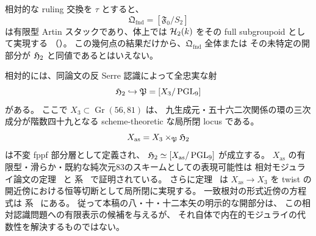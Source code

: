 相対的な ruling 交換を \(\tau\) とすると、
\[
 \mathfrak Q_{\mathrm{fnd}}=[\mathfrak F_0/S_2]
\]
は有限型 Artin スタックであり、体上では
\(\mathcal H_2(k)\) をその full subgroupoid として実現する
（\cite[\texttt{cor:h2-point-groupoid-foundation}]{QuadricModuli2026}）。
この幾何点の結果だけから、\(\mathfrak Q_{\mathrm{fnd}}\) 全体または
その未特定の開部分が \(\mathfrak H_2\) と同値であるとはいえない。

相対的には、同論文の反 Serre 認識によって全忠実な射
\[
 \mathfrak H_2\hookrightarrow
 \mathfrak P=[X_3/\operatorname{PGL}_9]
\]
がある。
ここで \(X_3\subset\operatorname{Gr}(56,81)\) は、
九生成元・五十六二次関係の環の三次成分が階数四十九となる
scheme-theoretic な局所閉 locus である。
\[
 X_{\mathrm{as}}=X_3\times_{\mathfrak P}\mathfrak H_2
\]
は不変 fppf 部分層として定義され、
\(\mathfrak H_2\simeq[X_{\mathrm{as}}/\operatorname{PGL}_9]\) が成立する。
\(X_{\mathrm{as}}\) の有限型・滑らか・既約な純次元83のスキームとしての表現可能性は
相対モジュライ論文の定理~\cite[\texttt{thm:global-h2-smooth-finite-type}]{QuadricModuli2026} と
系~\cite[\texttt{cor:global-xas-smooth-scheme}]{QuadricModuli2026} で証明されている。
さらに定理~\cite[\texttt{thm:polarization-inertia-open}]{QuadricModuli2026}
は $X_{\mathrm{as}}\to X_3$ を twist の開近傍における恒等切断として局所閉に実現する。
一致根対の形式近傍の方程式は
系~\cite[\texttt{cor:coincident-polarized-inertia-branches}]{QuadricModuli2026} にある。
従って本稿の八・十・十二本矢の明示的な開部分は、
この相対認識問題への有限表示の候補を与えるが、
それ自体で内在的モジュライの代数性を解決するものではない。
